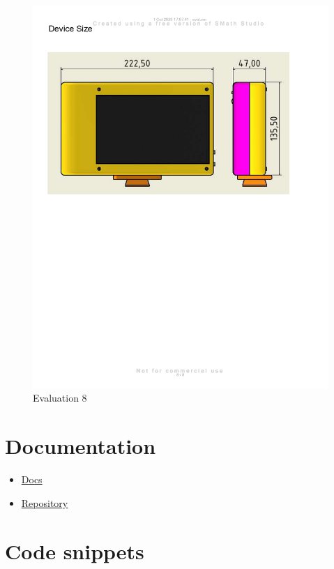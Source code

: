 \begin{figure}[H]
    \centering
    \includegraphics[width=\linewidth]{texs/appendix/data/evaluation/eval_page-0008.jpg}
    \caption{Evaluation 8}
    \label{fig:evaluation-8}
\end{figure}

\section{Documentation}

\begin{itemize}
    \item \href{https://haziqsabtu.github.io/SpeedCameraPi/}{Docs}
    \item \href{https://github.com/HaziqSabtu/SpeedCameraPi}{Repository}
\end{itemize}

\section{Code snippets}
